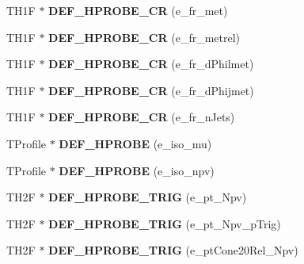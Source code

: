 \begin{DoxyCompactItemize}
\item 
\hypertarget{classHistos__Fake_a13170aa7a9aa01f59a03a60813625fbe}{
TH1F $\ast$ {\bfseries DEF\_\-HPROBE\_\-CR} (e\_\-fr\_\-met)}
\label{classHistos__Fake_a13170aa7a9aa01f59a03a60813625fbe}

\item 
\hypertarget{classHistos__Fake_ae110e6263664e21a1b7a953a698b19ff}{
TH1F $\ast$ {\bfseries DEF\_\-HPROBE\_\-CR} (e\_\-fr\_\-metrel)}
\label{classHistos__Fake_ae110e6263664e21a1b7a953a698b19ff}

\item 
\hypertarget{classHistos__Fake_ab8b9ca3fd788dcd47b1e080ffaae91dc}{
TH1F $\ast$ {\bfseries DEF\_\-HPROBE\_\-CR} (e\_\-fr\_\-dPhilmet)}
\label{classHistos__Fake_ab8b9ca3fd788dcd47b1e080ffaae91dc}

\item 
\hypertarget{classHistos__Fake_aa32faa75c2f11ddf9083d2d603523e70}{
TH1F $\ast$ {\bfseries DEF\_\-HPROBE\_\-CR} (e\_\-fr\_\-dPhijmet)}
\label{classHistos__Fake_aa32faa75c2f11ddf9083d2d603523e70}

\item 
\hypertarget{classHistos__Fake_a6fe2da25efda698bc5a4f8ff32be66e9}{
TH1F $\ast$ {\bfseries DEF\_\-HPROBE\_\-CR} (e\_\-fr\_\-nJets)}
\label{classHistos__Fake_a6fe2da25efda698bc5a4f8ff32be66e9}

\item 
\hypertarget{classHistos__Fake_af6b81c0a3eb3fb0a54decf201a65652a}{
TProfile $\ast$ {\bfseries DEF\_\-HPROBE} (e\_\-iso\_\-mu)}
\label{classHistos__Fake_af6b81c0a3eb3fb0a54decf201a65652a}

\item 
\hypertarget{classHistos__Fake_a25a217ad64605f80908c2373a5f779dd}{
TProfile $\ast$ {\bfseries DEF\_\-HPROBE} (e\_\-iso\_\-npv)}
\label{classHistos__Fake_a25a217ad64605f80908c2373a5f779dd}

\item 
\hypertarget{classHistos__Fake_ab2c15d33dbd19624dcffd859b3c04fd4}{
TH2F $\ast$ {\bfseries DEF\_\-HPROBE\_\-TRIG} (e\_\-pt\_\-Npv)}
\label{classHistos__Fake_ab2c15d33dbd19624dcffd859b3c04fd4}

\item 
\hypertarget{classHistos__Fake_a688a69e951cc32333f634a4b1f9a1e38}{
TH2F $\ast$ {\bfseries DEF\_\-HPROBE\_\-TRIG} (e\_\-pt\_\-Npv\_\-pTrig)}
\label{classHistos__Fake_a688a69e951cc32333f634a4b1f9a1e38}

\item 
\hypertarget{classHistos__Fake_a699ffce15dc64f42506781bc256f3c8d}{
TH2F $\ast$ {\bfseries DEF\_\-HPROBE\_\-TRIG} (e\_\-ptCone20Rel\_\-Npv)}
\label{classHistos__Fake_a699ffce15dc64f42506781bc256f3c8d}


\end{DoxyCompactItemize}
